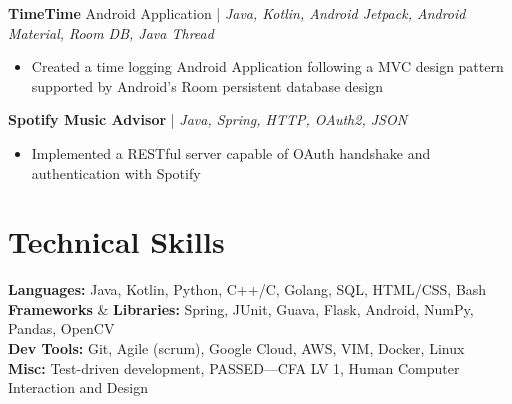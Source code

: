 \documentclass[12pt, letterpaper]{article}
\begin{document}
\textbf{TimeTime} Android Application | \small\textit{Java, Kotlin, Android Jetpack, Android Material, Room DB, Java Thread}
\begin{itemize}[noitemsep,topsep=0pt]
  \item Created a time logging Android Application following a MVC design pattern supported by Android's Room persistent database design
\end{itemize}

\textbf{Spotify Music Advisor} | \small\textit{Java, Spring, HTTP, OAuth2, JSON}
\begin{itemize}[noitemsep,topsep=0pt]
  \item Implemented a RESTful server capable of OAuth handshake and authentication with Spotify
\end{itemize}

\section{Technical Skills}
\textbf{Languages:} Java, Kotlin, Python, C++/C, Golang, SQL, HTML/CSS, Bash \\
\textbf{Frameworks} \& \textbf{Libraries:} Spring, JUnit, Guava, Flask, Android, NumPy, Pandas, OpenCV \\
\textbf{Dev Tools:} Git, Agile (scrum), Google Cloud, AWS, VIM, Docker, Linux \\
\textbf{Misc:} Test-driven development, PASSED---CFA LV 1, Human Computer Interaction and Design
\end{document}
